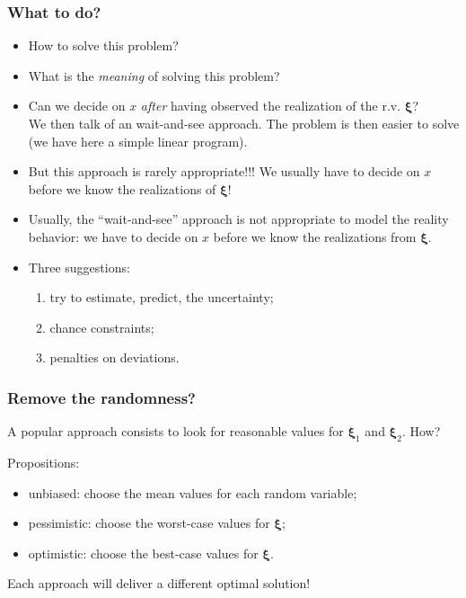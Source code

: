 \documentclass{beamer}
\def\bxi{\boldsymbol\xi}
\def\bxi{\boldsymbol\xi}
\begin{document}
\begin{frame}
	\frametitle{What to do?}
	
	\begin{itemize}
		\item
		How to solve this problem?
		\item
		What is the {\sl meaning} of solving this problem?
		\item
		Can we decide on $x$ {\sl after} having observed the realization of the r.v. $\bxi$?\\
		We then talk of an {\red wait-and-see} approach.
		The problem is then easier to solve (we have here a simple linear program).
		\item
		But this approach is rarely appropriate!!! We usually have to decide on $x$ {\red before} we know the realizations of $\bxi$!
		\item
		Usually, the ``wait-and-see'' approach is not appropriate to model the reality behavior: we have to decide on $x$ before we know the realizations from $\bxi$.
		\item
		Three suggestions:
		\begin{enumerate}
			\item
			try to estimate, predict, the uncertainty;
			\item
			chance constraints;
			\item
			penalties on deviations.
		\end{enumerate}
	\end{itemize}
	
\end{frame}

\begin{frame}
	\frametitle{Remove the randomness?}
	
	A popular approach consists to look for reasonable values for $\bxi_1$ and $\bxi_2$.
	How?
	
	\mbox{}
	
	Propositions:
	\begin{itemize}
		\item unbiased: choose the mean values for each random variable;
		\item pessimistic: choose the worst-case values for $\bxi$;
		\item optimistic: choose the best-case values for $\bxi$.
	\end{itemize}
	
	Each approach will deliver a different optimal solution!
	
\end{frame}
\end{document}
